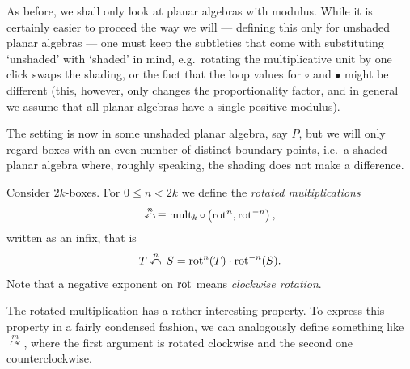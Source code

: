 As before, we shall only look at planar algebras with modulus. While it is certainly easier to proceed the way we will --- defining this only for unshaded planar algebras --- one must keep the subtleties that come with substituting `unshaded' with `shaded' in mind, e.g.\ rotating the multiplicative unit by one click swaps the shading, or the fact that the loop values for $\circ$ and {$\bullet$} might be different (this, however, only changes the proportionality factor, and in general we assume that all planar algebras have a single positive modulus).

\bigno The setting is now in some unshaded planar algebra, say $P$, but we will only regard boxes with an even number of distinct boundary points, i.e.\ a shaded planar algebra where, roughly speaking, the shading does not make a difference.

\begin{definition}
Consider $2k$-boxes. For ${0\leq n < 2k}$
we define the \emph{rotated multiplications}
\begin{align*}
\stackrel{n}{\curvearrowleft}\,\equiv \operatorname{mult}_k \circ \left( \operatorname{rot}^n,\operatorname{rot}^{-n} \right),
\end{align*}
written as an infix, that is
\begin{align*}
T \stackrel{n}{\curvearrowleft}\, S = \operatorname{rot}^n(T)\cdot \operatorname{rot}^{-n}(S).
\end{align*}
Note that a negative exponent on $\operatorname{rot}$ means \emph{clockwise rotation}.
\end{definition}

The rotated multiplication has a rather interesting property. To express this property in a fairly condensed fashion, we can analogously define something like $\stackrel{m}{\curvearrowright}$, where the first argument is rotated clockwise and the second one counterclockwise.

